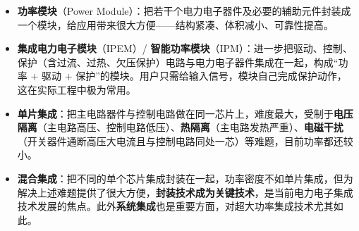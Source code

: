 \begin{itemize}
  \item \textbf{功率模块}（Power Module）：把若干个电力电子器件及必要的辅助元件封装成一个模块，给应用带来很大方便——结构紧凑、体积减小、可靠性提高。
  \item \textbf{集成电力电子模块}（IPEM）/ \textbf{智能功率模块}（IPM）：进一步把驱动、控制、保护（含过流、过热、欠压保护）电路与电力电子器件集成在一起，构成“功率 + 驱动 + 保护”的模块。用户只需给输入信号，模块自己完成保护动作，这在实际工程中极为常用。
  \item \textbf{单片集成}：把主电路器件与控制电路做在同一芯片上，难度最大，受制于\textbf{电压隔离}（主电路高压、控制电路低压）、\textbf{热隔离}（主电路发热严重）、\textbf{电磁干扰}（开关器件通断高压大电流且与控制电路同处一芯）等难题，目前功率都还较小。
  \item \textbf{混合集成}：把不同的单个芯片集成封装在一起，功率密度不如单片集成，但为解决上述难题提供了很大方便，\textbf{封装技术成为关键技术}，是当前电力电子集成技术发展的焦点。此外\textbf{系统集成}也是重要方面，对超大功率集成技术尤其如此。
\end{itemize}

